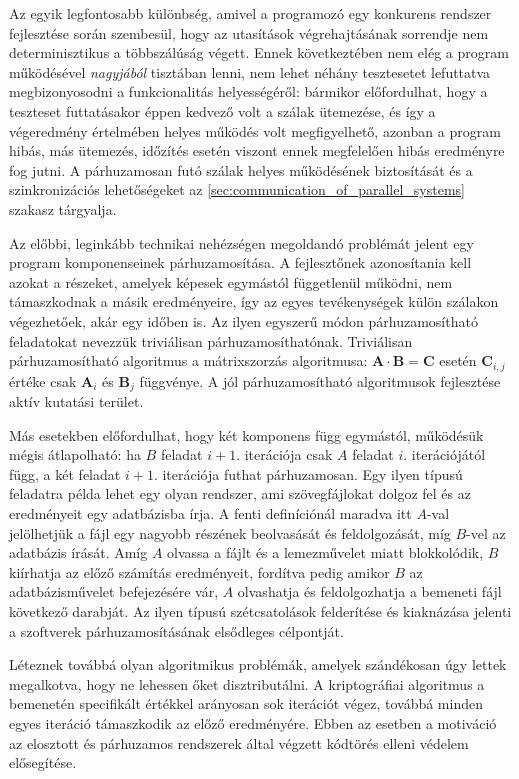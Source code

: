     Az egyik legfontosabb különbség, amivel a programozó egy konkurens rendszer fejlesztése során szembesül, hogy az utasítások végrehajtásának sorrendje nem determinisztikus a többszálúság végett. Ennek következtében nem elég a program működésével \emph{nagyjából} tisztában lenni, nem lehet néhány tesztesetet lefuttatva megbizonyosodni a funkcionalitás helyességéről: bármikor előfordulhat, hogy a teszteset futtatásakor éppen kedvező volt a szálak ütemezése, és így a végeredmény értelmében helyes működés volt megfigyelhető, azonban a program hibás, más ütemezés, időzítés esetén viszont ennek megfelelően hibás eredményre fog jutni. A párhuzamosan futó szálak helyes működésének biztosítását és a szinkronizációs lehetőségeket az \ref{sec:communication_of_parallel_systems} szakasz tárgyalja.
    
    Az előbbi, leginkább technikai nehézségen megoldandó problémát jelent egy program komponenseinek párhuzamosítása. A fejlesztőnek azonosítania kell azokat a részeket, amelyek képesek egymástól függetlenül működni, nem támaszkodnak a másik eredményeire, így az egyes tevékenységek külön szálakon végezhetőek, akár egy időben is. Az ilyen egyszerű módon párhuzamosítható feladatokat nevezzük triviálisan párhuzamosíthatónak. Triviálisan párhuzamosítható algoritmus a mátrixszorzás algoritmusa: $\bm A \cdot \bm B = \bm C$ esetén $\bm C_{i, j}$ értéke csak $\bm A_i$ és $\bm B_j$ függvénye. A jól párhuzamosítható algoritmusok fejlesztése aktív kutatási terület.
    
    Más esetekben előfordulhat, hogy két komponens függ egymástól, működésük mégis átlapolható: ha $B$ feladat $i+1.$ iterációja csak $A$ feladat $i.$ iterációjától függ, a két feladat $i+1.$ iterációja futhat párhuzamosan. Egy ilyen típusú feladatra példa lehet egy olyan rendszer, ami szövegfájlokat dolgoz fel és az eredményeit egy adatbázisba írja. A fenti definíciónál maradva itt $A$-val jelölhetjük a fájl egy nagyobb részének beolvasását és feldolgozását, míg $B$-vel az adatbázis írását. Amíg $A$ olvassa a fájlt és a lemezművelet miatt blokkolódik, $B$ kiírhatja az előző számítás eredményeit, fordítva pedig amikor $B$ az adatbázisművelet befejezésére vár, $A$ olvashatja és feldolgozhatja a bemeneti fájl következő darabját. Az ilyen típusú szétcsatolások felderítése és kiaknázása jelenti a szoftverek párhuzamosításának elsődleges célpontját.
    
    Léteznek továbbá olyan algoritmikus problémák, amelyek szándékosan úgy lettek megalkotva, hogy ne lehessen őket disztributálni. A \cite{bcrypt} kriptográfiai algoritmus a bemenetén specifikált értékkel arányosan sok iterációt végez, továbbá minden egyes iteráció támaszkodik az előző eredményére. Ebben az esetben a motiváció az elosztott és párhuzamos rendszerek által végzett kódtörés elleni védelem elősegítése.
    

